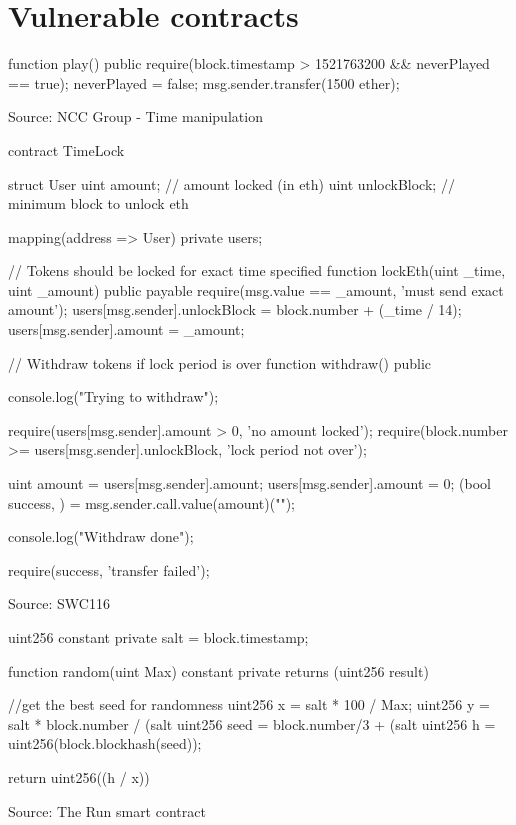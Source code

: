 \section{Vulnerable contracts}

\begin{solidity}
    function play() public {
        require(block.timestamp > 1521763200 && neverPlayed == true);
        neverPlayed = false;
        msg.sender.transfer(1500 ether);
    }
\end{solidity}
Source: NCC Group - Time manipulation \cite{DASP2018}

\begin{solidity}
    contract TimeLock {
        struct User {
            uint amount; // amount locked (in eth)
            uint unlockBlock; // minimum block to unlock eth
        }

        mapping(address => User) private users;

        // Tokens should be locked for exact time specified
        function lockEth(uint _time, uint _amount) public payable {
            require(msg.value == _amount, 'must send exact amount');
            users[msg.sender].unlockBlock = block.number + (_time / 14);
            users[msg.sender].amount = _amount;
        }

        // Withdraw tokens if lock period is over
        function withdraw() public {
            console.log("Trying to withdraw");

            require(users[msg.sender].amount > 0, 'no amount locked');
            require(block.number >= users[msg.sender].unlockBlock, 'lock period not over');

            uint amount = users[msg.sender].amount;
            users[msg.sender].amount = 0;
            (bool success, ) = msg.sender.call.value(amount)("");

            console.log("Withdraw done");

            require(success, 'transfer failed');
        }
    }
\end{solidity}
Source: SWC116 \cite{swc116}

\begin{solidity}
    uint256 constant private salt =  block.timestamp;
    
    function random(uint Max) constant private returns (uint256 result){
        //get the best seed for randomness
        uint256 x = salt * 100 / Max;
        uint256 y = salt * block.number / (salt %
        uint256 seed = block.number/3 + (salt %
        uint256 h = uint256(block.blockhash(seed)); 
    
        return uint256((h / x)) %
    }
\end{solidity}
Source: The Run smart contract \cite{therun_contract}